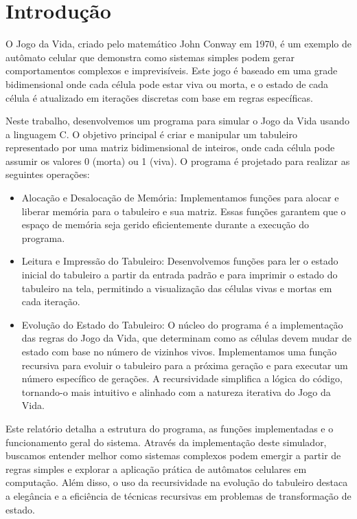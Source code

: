 \documentclass{article}
\begin{document}

\section{Introdução}

O Jogo da Vida, criado pelo matemático John Conway em 1970, é um exemplo de autômato celular que demonstra como sistemas simples podem gerar comportamentos complexos e imprevisíveis. Este jogo é baseado em uma grade bidimensional onde cada célula pode estar viva ou morta, e o estado de cada célula é atualizado em iterações discretas com base em regras específicas.

Neste trabalho, desenvolvemos um programa para simular o Jogo da Vida usando a linguagem C. O objetivo principal é criar e manipular um tabuleiro representado por uma matriz bidimensional de inteiros, onde cada célula pode assumir os valores 0 (morta) ou 1 (viva). O programa é projetado para realizar as seguintes operações:

\begin{itemize}
\item Alocação e Desalocação de Memória: Implementamos funções para alocar e liberar memória para o tabuleiro e sua matriz. Essas funções garantem que o espaço de memória seja gerido eficientemente durante a execução do programa.

\item Leitura e Impressão do Tabuleiro: Desenvolvemos funções para ler o estado inicial do tabuleiro a partir da entrada padrão e para imprimir o estado do tabuleiro na tela, permitindo a visualização das células vivas e mortas em cada iteração.

\item Evolução do Estado do Tabuleiro: O núcleo do programa é a implementação das regras do Jogo da Vida, que determinam como as células devem mudar de estado com base no número de vizinhos vivos. Implementamos uma função recursiva para evoluir o tabuleiro para a próxima geração e para executar um número específico de gerações. A recursividade simplifica a lógica do código, tornando-o mais intuitivo e alinhado com a natureza iterativa do Jogo da Vida.

\end{itemize}

Este relatório detalha a estrutura do programa, as funções implementadas e o funcionamento geral do sistema. Através da implementação deste simulador, buscamos entender melhor como sistemas complexos podem emergir a partir de regras simples e explorar a aplicação prática de autômatos celulares em computação. Além disso, o uso da recursividade na evolução do tabuleiro destaca a elegância e a eficiência de técnicas recursivas em problemas de transformação de estado.
\end{document}
